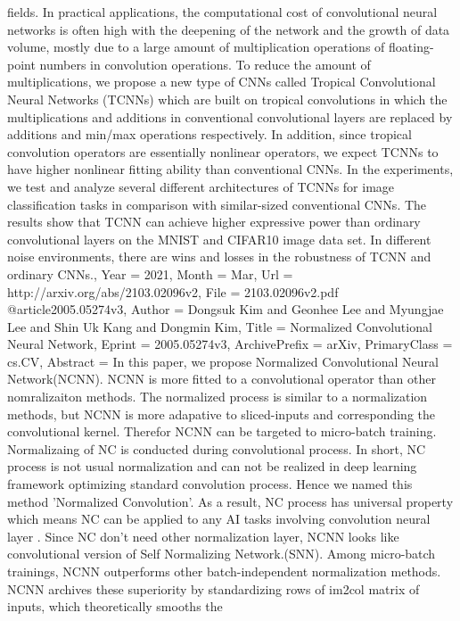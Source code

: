 {{{{{fields. In practical applications, the computational cost of convolutional
neural networks is often high with the deepening of the network and the growth
of data volume, mostly due to a large amount of multiplication operations of
floating-point numbers in convolution operations. To reduce the amount of
multiplications, we propose a new type of CNNs called Tropical Convolutional
Neural Networks (TCNNs) which are built on tropical convolutions in which the
multiplications and additions in conventional convolutional layers are replaced
by additions and min/max operations respectively. In addition, since tropical
convolution operators are essentially nonlinear operators, we expect TCNNs to
have higher nonlinear fitting ability than conventional CNNs. In the
experiments, we test and analyze several different architectures of TCNNs for
image classification tasks in comparison with similar-sized conventional CNNs.
The results show that TCNN can achieve higher expressive power than ordinary
convolutional layers on the MNIST and CIFAR10 image data set. In different
noise environments, there are wins and losses in the robustness of TCNN and
ordinary CNNs.},
Year          = {2021},
Month         = {Mar},
Url           = {http://arxiv.org/abs/2103.02096v2},
File          = {2103.02096v2.pdf}
}
@article{2005.05274v3,
Author        = {Dongsuk Kim and Geonhee Lee and Myungjae Lee and Shin Uk Kang and Dongmin Kim},
Title         = {Normalized Convolutional Neural Network},
Eprint        = {2005.05274v3},
ArchivePrefix = {arXiv},
PrimaryClass  = {cs.CV},
Abstract      = {In this paper, we propose Normalized Convolutional Neural Network(NCNN). NCNN
is more fitted to a convolutional operator than other nomralizaiton methods.
The normalized process is similar to a normalization methods, but NCNN is more
adapative to sliced-inputs and corresponding the convolutional kernel. Therefor
NCNN can be targeted to micro-batch training. Normalizaing of NC is conducted
during convolutional process. In short, NC process is not usual normalization
and can not be realized in deep learning framework optimizing standard
convolution process. Hence we named this method 'Normalized Convolution'. As a
result, NC process has universal property which means NC can be applied to any
AI tasks involving convolution neural layer . Since NC don't need other
normalization layer, NCNN looks like convolutional version of Self Normalizing
Network.(SNN). Among micro-batch trainings, NCNN outperforms other
batch-independent normalization methods. NCNN archives these superiority by
standardizing rows of im2col matrix of inputs, which theoretically smooths the
}}}}}
